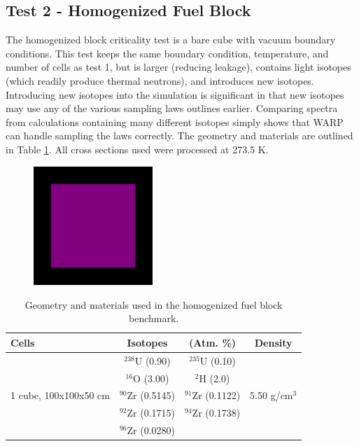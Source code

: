 \documentclass[preprint,12pt]{elsarticle}
\begin{document}
\newpage
\subsection{Test 2 - Homogenized Fuel Block}

The homogenized block criticality test is a bare cube with vacuum boundary conditions.  This test keeps the same boundary condition, temperature, and number of cells as test 1, but is larger (reducing leakage), contains light isotopes (which readily produce thermal neutrons), and introduces new isotopes.  Introducing new isotopes into the simulation is significant in that new isotopes may use any of the various sampling laws outlines earlier.  Comparing spectra from calculations containing many different isotopes simply shows that WARP can handle sampling the laws correctly.  The geometry and materials are outlined in Table \ref{homfuel_geom}.  All cross sections used were processed at 273.5 K.

\begin{figure}[h!] 
  \centering
    \includegraphics[width=0.4\textwidth]{graphics/homfuel-xy.png}
     \caption{  \label{homfuel_geom_pic} }
\end{figure}

\begin{table}[h]
\centering
\caption{Geometry and materials used in the homogenized fuel block benchmark.}
\label{homfuel_geom}
\begin{tabular}{| l | c  c | c |}
\hline
Cells & Isotopes & (Atm. \%)& Density \\
\hline
\multirow{5}{*}{1 cube, 100x100x50 cm }            &   $^{238}$U   (0.90)   &  $^{235}$U   (0.10)   &  \multirow{5}{*}{5.50 g/cm$^3$} \\
                                                   &   $^{16}$O    (3.00)   &  $^{2}$H     (2.0)    &  \\
                                                   &   $^{90}$Zr   (0.5145) &  $^{91}$Zr   (0.1122) &  \\
                                                   &   $^{92}$Zr   (0.1715) &  $^{94}$Zr   (0.1738) &  \\
                                                   &   $^{96}$Zr   (0.0280) &                       &  \\
\hline
\end{tabular}
\end{table}
\end{document}
